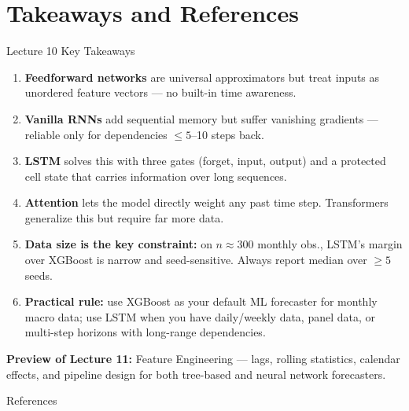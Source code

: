 \documentclass[aspectratio=169, 10pt]{beamer}
\begin{document}
\section{Takeaways and References}


\begin{frame}{Lecture 10 Key Takeaways}
  \begin{keybox}
    \footnotesize
    \begin{enumerate}
      \item \textbf{Feedforward networks} are universal approximators but
            treat inputs as unordered feature vectors --- no built-in
            time awareness.
      \item \textbf{Vanilla RNNs} add sequential memory but suffer
            vanishing gradients \parencite{Bengio1994} --- reliable only
            for dependencies $\leq 5$--10 steps back.
      \item \textbf{LSTM} \parencite{Hochreiter1997} solves this with
            three gates (forget, input, output) and a protected cell state
            that carries information over long sequences.
      \item \textbf{Attention} \parencite{Vaswani2017} lets the model
            directly weight any past time step. Transformers generalize
            this but require far more data.
      \item \textbf{Data size is the key constraint:} on $n \approx 300$
            monthly obs., LSTM's margin over XGBoost is narrow and
            seed-sensitive. Always report median over $\geq 5$ seeds.
      \item \textbf{Practical rule:} use XGBoost as your default ML
            forecaster for monthly macro data; use LSTM when you have
            daily/weekly data, panel data, or multi-step horizons with
            long-range dependencies.
    \end{enumerate}
  \end{keybox}

  \smallskip
  \textbf{Preview of Lecture 11:} Feature Engineering ---
  lags, rolling statistics, calendar effects, and pipeline design for
  both tree-based and neural network forecasters.
\end{frame}

\begin{frame}{References}
  \printbibliography[heading=none]
\end{frame}

\end{document}
